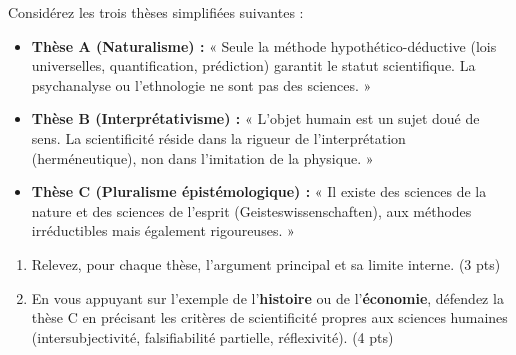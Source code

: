 \documentclass[11pt]{article}
\begin{document}
\begin{exercice}
Considérez les trois thèses simplifiées suivantes :
\begin{itemize}
    \item \textbf{Thèse A (Naturalisme) :} « Seule la méthode hypothético-déductive (lois universelles, quantification, prédiction) garantit le statut scientifique. La psychanalyse ou l'ethnologie ne sont pas des sciences. »
    \item \textbf{Thèse B (Interprétativisme) :} « L'objet humain est un sujet doué de sens. La scientificité réside dans la rigueur de l'interprétation (herméneutique), non dans l'imitation de la physique. »
    \item \textbf{Thèse C (Pluralisme épistémologique) :} « Il existe des sciences de la nature et des sciences de l'esprit (Geisteswissenschaften), aux méthodes irréductibles mais également rigoureuses. »
\end{itemize}
\begin{enumerate}
    \item Relevez, pour chaque thèse, l'argument principal et sa limite interne. (3 pts)
    \item En vous appuyant sur l'exemple de l'\textbf{histoire} ou de l'\textbf{économie}, défendez la thèse C en précisant les critères de scientificité propres aux sciences humaines (intersubjectivité, falsifiabilité partielle, réflexivité). (4 pts)
\end{enumerate}
\end{exercice}
\end{document}
